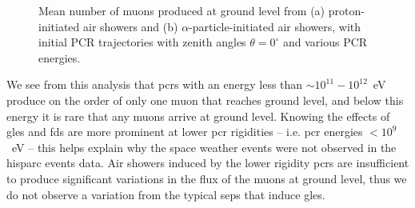 \begin{figure}[ht!]
	\centering
	\qquad
	\caption{Mean number of muons produced at ground level from (a) proton-initiated air showers and (b) $\alpha$-particle-initiated air showers, with initial PCR trajectories with zenith angles $\theta=0^{\circ}$ and various PCR energies.}
	\label{fig:shower_muons}
\end{figure}


We see from this analysis that \glspl{pcr} with an energy less than $\sim 10^{11}-10^{12}$~eV produce on the order of only one muon that reaches ground level, and below this energy it is rare that any muons arrive at ground level. Knowing the effects of \glspl{gle} and \glspl{fd} are more prominent at lower \gls{pcr} rigidities \citep{belov_solar_2005} -- i.e. \gls{pcr} energies $<10^9$~eV -- this helps explain why the space weather events were not observed in the \gls{hisparc} events data. Air showers induced by the lower rigidity \glspl{pcr} are insufficient to produce significant variations in the flux of the muons at ground level, thus we do not observe a variation from the typical \glspl{sep} that induce \glspl{gle}.

